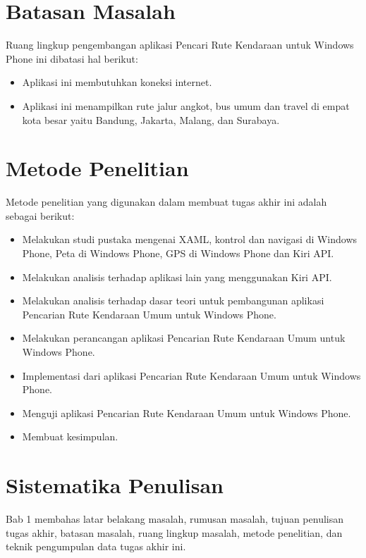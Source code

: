 \section{Batasan Masalah}
\label{sec:batasan_masalah}
Ruang lingkup pengembangan aplikasi Pencari Rute Kendaraan untuk Windows Phone ini dibatasi hal berikut:
\begin{itemize}
	\item Aplikasi ini membutuhkan koneksi internet.
	\item Aplikasi ini menampilkan rute jalur angkot, bus umum dan travel di empat kota besar yaitu Bandung, Jakarta, Malang, dan Surabaya.  
\end{itemize}

\section{Metode Penelitian}
\label{sec:metode_penelitian}
Metode penelitian yang digunakan dalam membuat tugas akhir ini adalah sebagai berikut:
\begin{itemize}
	\item Melakukan studi pustaka mengenai XAML, kontrol dan navigasi di Windows Phone, Peta di Windows Phone, GPS di Windows Phone dan Kiri API.
	\item Melakukan analisis terhadap aplikasi lain yang menggunakan Kiri API.
	\item Melakukan analisis terhadap dasar teori untuk pembangunan aplikasi Pencarian Rute Kendaraan Umum untuk Windows Phone.
	\item Melakukan perancangan aplikasi Pencarian Rute Kendaraan Umum untuk Windows Phone.
	\item Implementasi dari aplikasi Pencarian Rute Kendaraan Umum untuk Windows Phone.
	\item Menguji aplikasi Pencarian Rute Kendaraan Umum untuk Windows Phone.
	\item Membuat kesimpulan.
\end{itemize}


\section{Sistematika Penulisan}
\label{sec:sistematika_penulisan}
\hspace{0.5cm} Bab 1 membahas latar belakang masalah, rumusan masalah, tujuan penulisan tugas akhir, batasan masalah, ruang lingkup masalah, metode penelitian, dan teknik pengumpulan data tugas akhir ini.

